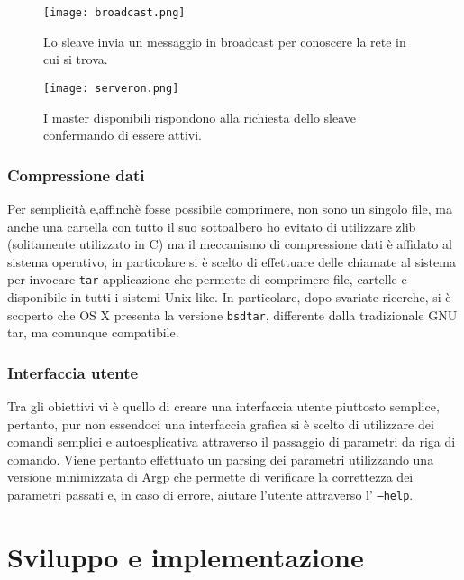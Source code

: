 \documentclass[11pt,fleqn]{book} %
\begin{document}
\begin{figure}[h]
	\centering
    \texttt{[image: broadcast.png]}
    \caption{Lo sleave invia un messaggio in broadcast per conoscere la rete in cui si trova.}
    \label{fig:awesome_image}
	\centering
    \texttt{[image: serveron.png]}
    \caption{I master disponibili rispondono alla richiesta dello sleave confermando di essere attivi.}
    \label{fig:awesome_image}
\end{figure}


\subsection{Compressione dati}\label{Compressione}
Per semplicità e,affinchè fosse possibile comprimere, non sono un singolo file, ma anche una cartella con tutto il suo sottoalbero ho evitato di utilizzare  zlib (solitamente utilizzato in C) ma il meccanismo di  compressione dati è affidato al sistema operativo, in particolare si è scelto di effettuare delle chiamate al sistema per invocare \texttt{tar} applicazione che permette di comprimere file, cartelle e disponibile in tutti i sistemi Unix-like.
In particolare, dopo svariate ricerche, si è scoperto che OS X presenta la versione \texttt{bsdtar}, differente dalla tradizionale GNU tar, ma comunque compatibile.

\subsection{Interfaccia utente}
Tra gli obiettivi vi è quello di creare una interfaccia utente piuttosto semplice, pertanto, pur non essendoci una interfaccia grafica si è scelto di utilizzare dei comandi semplici e autoesplicativa attraverso il passaggio di parametri da riga di comando.
Viene pertanto effettuato un parsing dei parametri utilizzando una versione minimizzata di Argp che permette di verificare la correttezza dei parametri passati e, in caso di errore, aiutare l'utente attraverso l' \texttt{---help}.


\chapter{Sviluppo e implementazione}
\end{document}
